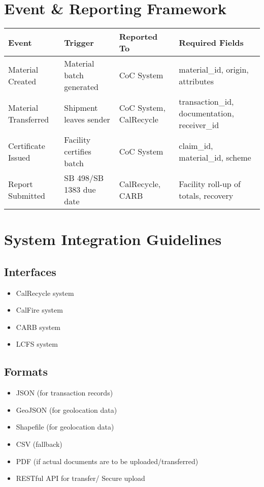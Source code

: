 \documentclass{article}
\begin{document}
\section{Event \& Reporting Framework}
\begin{longtable}{|p{4cm}|p{4cm}|p{4cm}|p{4cm}|}
\hline
\textbf{Event} & \textbf{Trigger} & \textbf{Reported To} & \textbf{Required Fields} \\
\hline
Material Created & Material batch generated & CoC System & material\_id, origin, attributes \\
Material Transferred & Shipment leaves sender & CoC System, CalRecycle & transaction\_id, documentation, receiver\_id \\
Certificate Issued & Facility certifies batch & CoC System & claim\_id, material\_id, scheme \\
Report Submitted & SB 498/SB 1383 due date & CalRecycle, CARB & Facility roll-up of totals, recovery \\
\hline
\end{longtable}

\section{System Integration Guidelines}
\subsection*{Interfaces}
\begin{itemize}[noitemsep]
    \item CalRecycle system
    \item CalFire system
    \item CARB system
    \item LCFS system
\end{itemize}

\subsection*{Formats}
\begin{itemize}[noitemsep]
    \item JSON (for transaction records)
    \item GeoJSON (for geolocation data)
    \item Shapefile (for geolocation data)
    \item CSV (fallback)
    \item PDF (if actual documents are to be uploaded/transferred)
    \item RESTful API for transfer/ Secure upload
\end{itemize}
\end{document}
